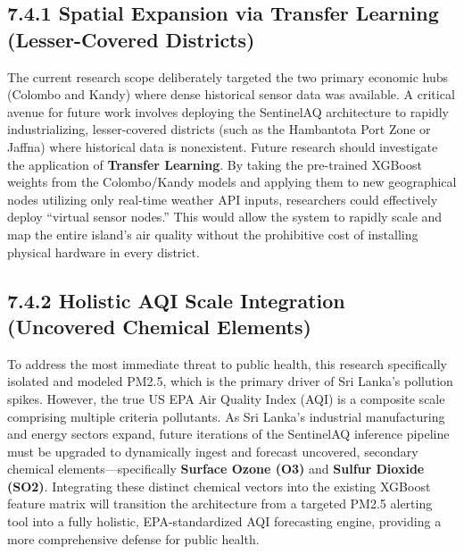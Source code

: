 \subsection{7.4.1 Spatial Expansion via Transfer Learning
(Lesser-Covered
Districts)}\label{spatial-expansion-via-transfer-learning-lesser-covered-districts}

The current research scope deliberately targeted the two primary
economic hubs (Colombo and Kandy) where dense historical sensor data was
available. A critical avenue for future work involves deploying the
SentinelAQ architecture to rapidly industrializing, lesser-covered
districts (such as the Hambantota Port Zone or Jaffna) where historical
data is nonexistent. Future research should investigate the application
of \textbf{Transfer Learning}. By taking the pre-trained XGBoost weights
from the Colombo/Kandy models and applying them to new geographical
nodes utilizing only real-time weather API inputs, researchers could
effectively deploy ``virtual sensor nodes.'' This would allow the system
to rapidly scale and map the entire island's air quality without the
prohibitive cost of installing physical hardware in every district.

\subsection{7.4.2 Holistic AQI Scale Integration (Uncovered Chemical
Elements)}\label{holistic-aqi-scale-integration-uncovered-chemical-elements}

To address the most immediate threat to public health, this research
specifically isolated and modeled PM2.5, which is the primary driver of
Sri Lanka's pollution spikes. However, the true US EPA Air Quality Index
(AQI) is a composite scale comprising multiple criteria pollutants. As
Sri Lanka's industrial manufacturing and energy sectors expand, future
iterations of the SentinelAQ inference pipeline must be upgraded to
dynamically ingest and forecast uncovered, secondary chemical
elements---specifically \textbf{Surface Ozone (O3)} and \textbf{Sulfur
Dioxide (SO2)}. Integrating these distinct chemical vectors into the
existing XGBoost feature matrix will transition the architecture from a
targeted PM2.5 alerting tool into a fully holistic, EPA-standardized AQI
forecasting engine, providing a more comprehensive defense for public
health.
